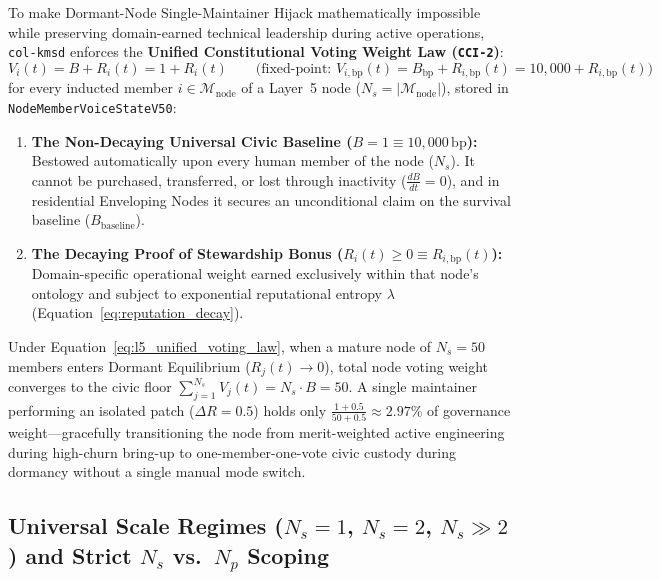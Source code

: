 To make Dormant-Node Single-Maintainer Hijack mathematically impossible while preserving domain-earned technical leadership during active operations, \texttt{col-kmsd} enforces the \textbf{Unified Constitutional Voting Weight Law (\texttt{CCI-2})}:
\begin{equation}
V_i(t) = B + R_i(t) = 1 + R_i(t) \qquad \bigl(\text{fixed-point: } V_{i,\mathrm{bp}}(t) = B_{\mathrm{bp}} + R_{i,\mathrm{bp}}(t) = 10{,}000 + R_{i,\mathrm{bp}}(t)\bigr)
\label{eq:l5_unified_voting_law}
\end{equation}
for every inducted member $i \in \mathcal{M}_{\mathrm{node}}$ of a Layer~5 node ($N_s = |\mathcal{M}_{\mathrm{node}}|$), stored in \texttt{NodeMemberVoiceStateV50}:
\begin{enumerate}
  \item \textbf{The Non-Decaying Universal Civic Baseline ($B = 1 \equiv 10{,}000\,\mathrm{bp}$):} Bestowed automatically upon every human member of the node ($N_s$). It cannot be purchased, transferred, or lost through inactivity ($\frac{dB}{dt} = 0$), and in residential Enveloping Nodes it secures an unconditional claim on the survival baseline ($B_{\mathrm{baseline}}$).
  \item \textbf{The Decaying Proof of Stewardship Bonus ($R_i(t) \ge 0 \equiv R_{i,\mathrm{bp}}(t)$):} Domain-specific operational weight earned exclusively within that node's ontology and subject to exponential reputational entropy $\lambda$ (Equation~\ref{eq:reputation_decay}).
\end{enumerate}

Under Equation~\eqref{eq:l5_unified_voting_law}, when a mature node of $N_s = 50$ members enters Dormant Equilibrium ($R_j(t) \to 0$), total node voting weight converges to the civic floor $\sum_{j=1}^{N_s} V_j(t) = N_s \cdot B = 50$. A single maintainer performing an isolated patch ($\Delta R = 0.5$) holds only $\frac{1 + 0.5}{50 + 0.5} \approx 2.97\%$ of governance weight---gracefully transitioning the node from merit-weighted active engineering during high-churn bring-up to one-member-one-vote civic custody during dormancy without a single manual mode switch.

\subsection{Universal Scale Regimes (\texorpdfstring{$N_s = 1$, $N_s = 2$, $N_s \gg 2$}{N\_s = 1, 2, >> 2}) and Strict \texorpdfstring{$N_s$ vs.\ $N_p$}{N\_s vs. N\_p} Scoping}

